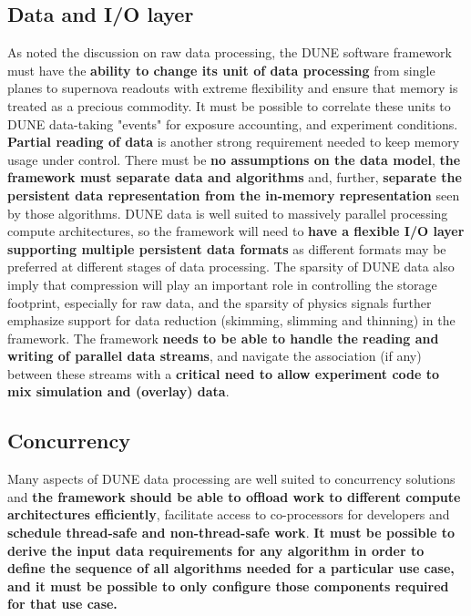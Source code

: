 \documentclass[../main-v1.tex]{subfiles}
\begin{document}
\subsection{Data and I/O layer}
As noted the discussion on raw data processing, the DUNE software framework must have the {\bf ability to  change its unit of data processing} from single planes to supernova readouts with extreme flexibility and ensure that memory is treated as a precious commodity.  
It must be possible to correlate these units to DUNE data-taking "events" for exposure accounting, and experiment conditions.
{\bf Partial reading of data} is another strong requirement needed to keep memory usage under control.  There must be {\bf no assumptions on the data model}, {\bf the framework must separate data and algorithms} and,  further, {\bf separate the persistent data representation from the in-memory representation} seen by those algorithms.  DUNE data is well suited to massively parallel processing compute architectures, so the framework will need to {\bf have a flexible I/O layer supporting multiple persistent data formats} as different formats may be preferred at different stages of data processing.  The sparsity of DUNE data also imply that compression will play an important role in controlling the storage footprint, especially for raw data, and the sparsity of physics signals further emphasize support for data reduction (skimming, slimming and thinning) in the framework.  The framework {\bf needs to be able to handle the reading and writing of parallel data streams}, and navigate the association (if any) between these streams with a {\bf critical need to allow experiment code to  mix simulation and (overlay) data}.

\subsection{Concurrency}
Many aspects of DUNE data processing are well suited to concurrency solutions and {\bf the framework should be able to offload work to different compute architectures efficiently}, facilitate access to co-processors for developers and {\bf schedule thread-safe and non-thread-safe work}.  {\bf It must be possible to derive the input data requirements for any algorithm in order to define the sequence of all algorithms needed for a particular use case, and it must be possible to only configure those components required for that use case.}
\end{document}
